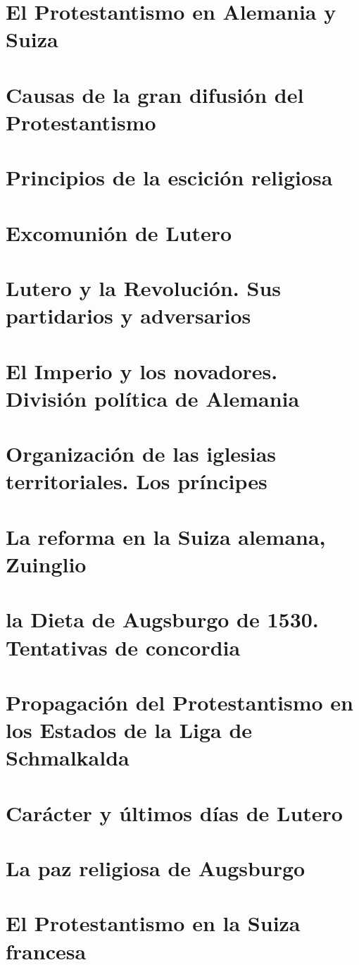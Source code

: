 \raggedbottom{} \documentclass[12pt]{book}
\begin{document}
\section{El Protestantismo en Alemania y Suiza}
\section{Causas de la gran difusión del Protestantismo}
\section{Principios de la escición religiosa}
\section{Excomunión de Lutero}
\section{Lutero y la Revolución. Sus partidarios y adversarios}
\section{El Imperio y los novadores. División política de Alemania}
\section{Organización de las iglesias territoriales. Los príncipes}
\section{La reforma en la Suiza alemana, Zuinglio}
\section{la Dieta de Augsburgo de 1530. Tentativas de concordia}
\section{Propagación del Protestantismo en los Estados de la Liga de Schmalkalda}
\section{Carácter y últimos días de Lutero}
\section{La paz religiosa de Augsburgo}
\section{El Protestantismo en la Suiza francesa}
\end{document}
